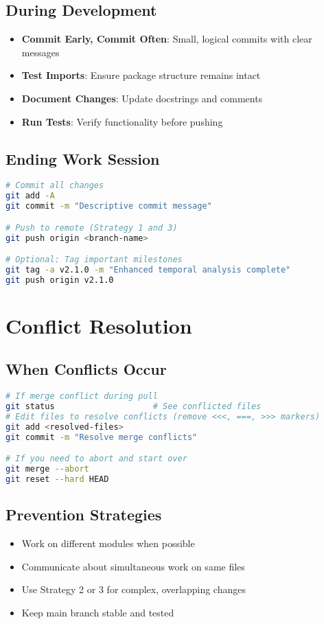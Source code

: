 \documentclass[11pt,letterpaper]{article}
\begin{document}
\subsection{During Development}
\begin{itemize}
    \item \textbf{Commit Early, Commit Often}: Small, logical commits with clear messages
    \item \textbf{Test Imports}: Ensure package structure remains intact
    \item \textbf{Document Changes}: Update docstrings and comments
    \item \textbf{Run Tests}: Verify functionality before pushing
\end{itemize}

\subsection{Ending Work Session}
\begin{lstlisting}[language=bash]
# Commit all changes
git add -A
git commit -m "Descriptive commit message"

# Push to remote (Strategy 1 and 3)
git push origin <branch-name>

# Optional: Tag important milestones
git tag -a v2.1.0 -m "Enhanced temporal analysis complete"
git push origin v2.1.0
\end{lstlisting}

\section{Conflict Resolution}

\subsection{When Conflicts Occur}
\begin{lstlisting}[language=bash]
# If merge conflict during pull
git status                    # See conflicted files
# Edit files to resolve conflicts (remove <<<, ===, >>> markers)
git add <resolved-files>
git commit -m "Resolve merge conflicts"

# If you need to abort and start over
git merge --abort
git reset --hard HEAD
\end{lstlisting}

\subsection{Prevention Strategies}
\begin{itemize}
    \item Work on different modules when possible
    \item Communicate about simultaneous work on same files
    \item Use Strategy 2 or 3 for complex, overlapping changes
    \item Keep main branch stable and tested
\end{itemize}
\end{document}
